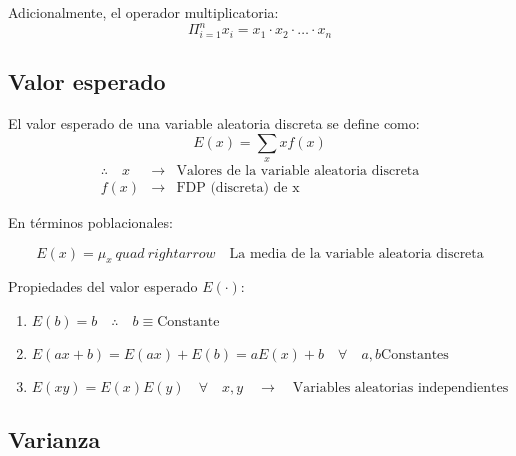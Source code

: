 \documentclass[
]{book}
\providecommand{\tightlist}{%
  \setlength{\itemsep}{0pt}\setlength{\parskip}{0pt}}
\begin{document}
Adicionalmente, el operador multiplicatoria:
\[
\Pi_{i=1}^n x_i = x_1\cdot x_2 \cdot \ldots \cdot x_n
\]

\hypertarget{valor-esperado}{%
\subsection{Valor esperado}\label{valor-esperado}}

El valor esperado de una variable aleatoria discreta se define como:
\[
E(x) = \sum_x xf(x)
\]
\[
\begin{array}{ccc}
\therefore \quad x & \rightarrow & \text{Valores de la variable aleatoria discreta} \\
f(x) & \rightarrow & \text{FDP (discreta) de x}
\end{array}
\]

En términos poblacionales:

\[
E(x) = \mu_x \ quad \ rightarrow \quad \text{La media de la variable aleatoria discreta}
\]

Propiedades del valor esperado \(E(\cdot)\):

\begin{enumerate}
\def\labelenumi{\arabic{enumi}.}
\tightlist
\item
  \(E(b) = b \quad \therefore \quad b \equiv \text{Constante}\)
\item
  \(E(ax + b) = E(ax) + E(b) = aE(x) + b \quad \forall \quad a,b \text{Constantes}\)
\item
  \(E(xy) = E(x)E(y) \quad \forall \quad x,y \quad \rightarrow \quad \text{Variables aleatorias independientes}\)
\end{enumerate}

\hypertarget{varianza}{%
\subsection{Varianza}\label{varianza}}

  
\end{document}

